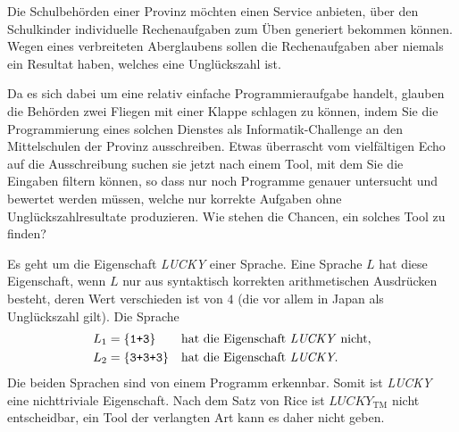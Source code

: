 Die Schulbehörden einer Provinz möchten einen Service anbieten,
über den Schulkinder individuelle Rechenaufgaben zum Üben generiert
bekommen können.
Wegen eines verbreiteten Aberglaubens sollen die Rechenaufgaben
aber niemals ein Resultat haben, welches eine Unglückszahl ist.

Da es sich dabei um eine relativ einfache Programmieraufgabe handelt,
glauben die Behörden zwei Fliegen mit einer Klappe schlagen zu können,
indem Sie die Programmierung eines solchen Dienstes als Informatik-Challenge 
an den Mittelschulen der Provinz ausschreiben.
Etwas überrascht vom vielfältigen Echo auf die Ausschreibung suchen sie
jetzt nach einem Tool, mit dem Sie die Eingaben filtern können, so dass
nur noch Programme genauer untersucht und bewertet werden müssen, welche
nur korrekte Aufgaben ohne Unglückszahlresultate produzieren.
Wie stehen die Chancen, ein solches Tool zu finden?

\begin{loesung}
Es geht um die Eigenschaft \textit{LUCKY} einer Sprache.
Eine Sprache $L$ hat diese Eigenschaft, wenn $L$ nur aus syntaktisch
korrekten arithmetischen Ausdrücken besteht, deren Wert verschieden
ist von $4$ (die vor allem in Japan als Unglückszahl gilt).
Die Sprache
\[
\begin{aligned}
L_1&=\{\texttt{1+3}\}&&\text{hat die Eigenschaft \textit{LUCKY} nicht,}\\
L_2&=\{\texttt{3+3+3}\}&&\text{hat die Eigenschaft \textit{LUCKY}.}
\end{aligned}
\]
Die beiden Sprachen sind von einem Programm erkennbar.
Somit ist \textit{LUCKY} eine nichttriviale Eigenschaft.
Nach dem Satz von Rice ist $\textit{LUCKY}_{\text{TM}}$ nicht
entscheidbar, ein Tool der verlangten Art kann es daher nicht geben.
\end{loesung}

